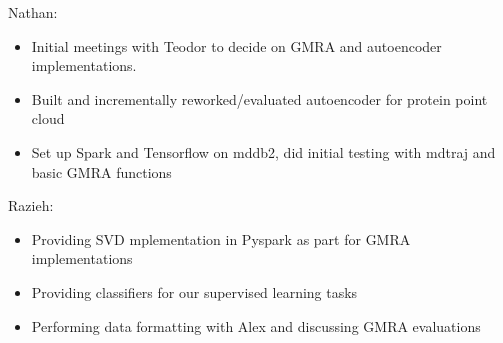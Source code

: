 \documentclass{article}
\begin{document}
Nathan:
\begin{itemize}
	\item Initial meetings with Teodor to decide on GMRA and autoencoder implementations.
	\item Built and incrementally reworked/evaluated autoencoder for protein point cloud
	\item Set up Spark and Tensorflow on mddb2, did initial testing with mdtraj and basic GMRA functions
\end{itemize}

Razieh:
\begin{itemize}
	\item Providing SVD mplementation in Pyspark as part for GMRA implementations
	\item Providing classifiers for our supervised learning tasks
	\item Performing data formatting with Alex and discussing GMRA evaluations
\end{itemize}

{\color{red}{TODO:}}

\small
{}

\end{document}
